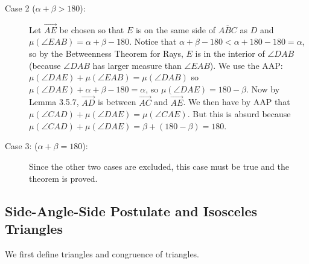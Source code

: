 \documentclass[12pt]{article}
\begin{document}
\begin{description}
\begin{description}
\item [Case 2 ($\alpha+\beta>180$):]  Let $\overrightarrow{AE}$ be chosen so that $E$ is on the same side of $\overline{ABC}$ as $D$ and $\mu(\angle EAB) = \alpha+\beta-180$.
Notice that $\alpha+\beta-180 <\alpha+180-180 = \alpha$, so by the Betweenness Theorem for Rays, $E$ is in the interior of $\angle DAB$ (because $\angle {DAB}$ has larger measure than $\angle{EAB}$).  We use the AAP:  $\mu(\angle DAE ) + \mu(\angle EAB) = \mu(\angle DAB)$ so $\mu(\angle DAE) + \alpha+\beta -180 = \alpha$, so 
$\mu(\angle DAE) = 180-\beta$.  Now by Lemma 3.5.7, $\overrightarrow{AD}$ is between $\overrightarrow{AC}$ and $\overrightarrow{AE}$.  We then have by
AAP that $\mu(\angle CAD) + \mu(\angle DAE) = \mu(\angle CAE)$.  But this is absurd because $\mu(\angle CAD) + \mu(\angle DAE)=\beta + (180-\beta) =180$.

\item[Case 3: ($\alpha+\beta=180$):]  Since the other two cases are excluded, this case must be true and the theorem is proved.

\end{description}                                

\end{description}

\subsection{Side-Angle-Side Postulate and Isosceles Triangles}

We first define triangles and congruence of triangles.
\end{document}
